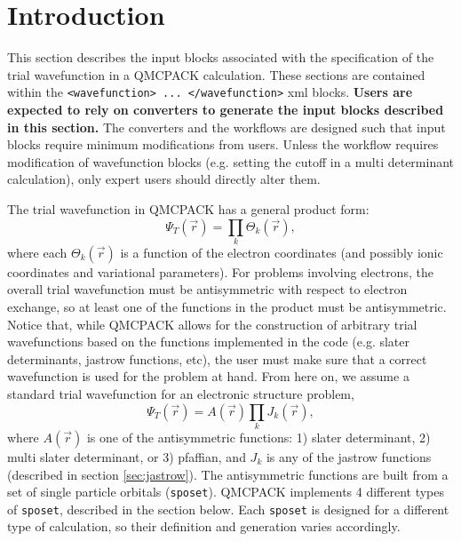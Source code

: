\section{Introduction}
\label{sec:intro_wavefunction}

This section describes the input blocks associated with the specification of the trial wavefunction in a QMCPACK calculation. These sections are contained within the \texttt{<wavefunction> ...  </wavefunction>} xml blocks. \textbf{Users are expected to rely on converters to generate the input blocks described in this section.} The converters and the workflows are designed such that input blocks require minimum modifications from users. Unless the workflow requires modification of wavefunction blocks (e.g. setting the cutoff in a multi determinant calculation), only expert users should directly alter them.
  
The trial wavefunction in QMCPACK has a general product form:
\begin{equation}
\Psi_T(\vec{r}) = \prod_k \Theta_k(\vec{r}),
\end{equation}
where each $\Theta_k(\vec{r})$ is a function of the electron coordinates (and possibly ionic coordinates and variational parameters). For problems involving electrons, the overall trial wavefunction must be antisymmetric with respect to electron exchange, so at least one of the functions in the product must be antisymmetric. Notice that, while QMCPACK allows for the construction of arbitrary trial wavefunctions based on the functions implemented in the code (e.g. slater determinants, jastrow functions, etc), the user must make sure that a correct wavefunction is used for the problem at hand. From here on, we assume a standard trial wavefunction for an electronic structure problem, 
\begin{equation}
\Psi_T(\vec{r}) =  \textit{A}(\vec{r}) \prod_k \textit{J}_k(\vec{r}),
\end{equation}
where $\textit{A}(\vec{r})$ is one of the antisymmetric functions: 1) slater determinant, 2) multi slater determinant, or 3) pfaffian, and $\textit{J}_k$ is any of the jastrow functions (described in section \ref{sec:jastrow}).  The antisymmetric functions are built from a set of single particle orbitals (\texttt{sposet}). QMCPACK implements 4 different types of \texttt{sposet}, described in the section below. Each \texttt{sposet} is designed for a different type of calculation, so their definition and generation varies accordingly. 
